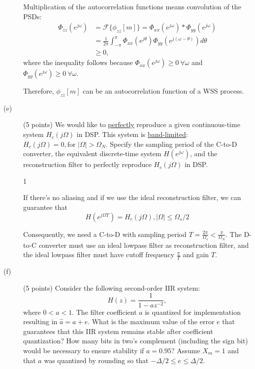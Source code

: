 \documentclass[10pt]{article}
\def\SOLUTIONS{1} %
\def\SolutionsColor{red2}
\begin{document}
\begin{description}
{Multiplication of the autocorrelation functions means convolution of the PSDs:
\begin{align*}
  \Phi_{zz}(e^{j\omega}) &= \mathcal{F}\{\phi_{zz}[m]\} = \Phi_{xx}(e^{j\omega}) \ast \Phi_{yy}(e^{j\omega}) \\
  &= \frac{1}{2\pi}\int_{-\pi}^\pi \Phi_{xx}(e^{j\theta})\Phi_{yy}(e^{j(\omega-\theta)})d\theta \\
  &\geq 0,
\end{align*}
where the inequality follows because $\Phi_{xx}(e^{j\omega}) \geq 0~\forall\omega$ and $\Phi_{yy}(e^{j\omega}) \geq 0~\forall\omega$.

Therefore, $\phi_{zz}[m]$ can be an autocorrelation function of a WSS process.
}
\else\vspace{7cm}
\fi

%
\item[(e)] (5 points) We would like to \underline{perfectly} reproduce a given continuous-time system $H_c(j\Omega)$ in DSP. This system is \underline{band-limited}: $H_c(j\Omega) = 0, \text{for } |\Omega| > \Omega_N$. Specify the sampling period of the C-to-D converter, the equivalent discrete-time system $H(e^{j\omega})$, and the reconstruction filter to perfectly reproduce $H_c(j\Omega)$ in DSP.

\if\SOLUTIONS1
{\color{\SolutionsColor} 
If there's no aliasing and if we use the ideal reconstruction filter, we can guarantee that
\begin{equation}
H(e^{j\Omega T}) = H_c(j\Omega), |\Omega| \leq \Omega_s/2
\end{equation}

Consequently, we need a C-to-D with sampling period $T = \frac{2\pi}{\Omega_s} < \frac{\pi}{\Omega_N}$. The D-to-C converter must use an ideal lowpass filter as reconstruction filter, and the ideal lowpass filter must have cutoff frequency $\frac{\pi}{T}$ and gain $T$.

}
\else\vspace{4cm}
\fi


%
\item[(f)] (5 points) Consider the following second-order IIR system:
\begin{equation}
H(z) = \frac{1}{1 - az^{-2}},
\end{equation}
where $0 < a < 1$. The filter coefficient $a$ is quantized for implementation resulting in $\hat{a} = a + e$. What is the maximum value of the error $e$ that guarantees that this IIR system remains stable after coefficient quantization? How many bits in two's complement (including the sign bit) would be necessary to ensure stability if $a = 0.95$? Assume $X_m = 1$ and that $a$ was quantized by rounding so that $-\Delta/2\leq e\leq \Delta/2$.


\end{description}
\end{document}
